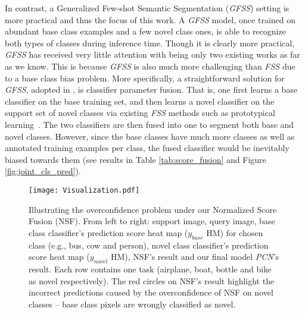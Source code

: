 \documentclass[journal]{IEEEtran}
\begin{document}
In contrast, a Generalized Few-shot Semantic Segmentation (\textit{GFSS}) setting is more practical and thus the focus of this work. 
A \textit{GFSS} model, once trained on abundant base class examples and a few novel class ones, is able to recognize both types of classes during inference time. Though it is clearly more practical, \textit{GFSS} has received very little attention with  \cite{liu2020dynamic,tian2020generalized} being only two existing works as far as we know. This is because \textit{GFSS} is also much more challenging than \textit{FSS} due to a base class bias problem. More specifically, a straightforward solution for \textit{GFSS}, adopted in \cite{liu2020dynamic,tian2020generalized}, is classifier parameter fusion. That is, one first learns a base classifier on the base training set, and then learns a novel classifier on the support set of novel classes via existing \textit{FSS} methods such as prototypical learning~\cite{dong2018few,liu2020part,wang2019panet}. The two classifiers are then fused into one to segment both base and novel classes. 
However, since the base classes have much more classes as well as annotated training examples per class, the fused classifier would be inevitably biased towards them (see results in Table \ref{tab:score_fusion} and Figure \ref{fig:joint_cls_pred}).

\begin{figure*}[ht]
    \centering
    \texttt{[image: Visualization.pdf]}
    \caption{Illustrating the overconfidence problem under our Normalized Score Fusion (NSF). From left to right: support image, query image, base class classifier's prediction score heat map ($y_{base}$ HM) for chosen class (e.g., bus, cow and person), novel class classifier's prediction score heat map ($y_{novel}$ HM), NSF's result and our final model \textit{PCN}'s result. Each row contains one task (airplane, boat, bottle and bike as novel respectively). The red circles on NSF's result highlight the incorrect predictions caused by the overconfidence of NSF on novel classes -- base class pixels are  wrongly classified as novel.}
    \label{fig:visacm}
\end{figure*}
\end{document}
